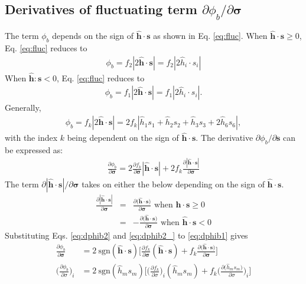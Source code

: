 \documentclass[12pt]{amsart}
\begin{document}
\subsection{Derivatives of fluctuating term $\partial\phi_b/\partial\mathbf{\sigma}$}
\label{sec:2.2}
The term $\phi_b$ depends on the sign of $\hat{\mathbf{h}}\cdot\mathbf{s}$ as shown in Eq. \ref{eq:fluc}.
When $\hat{\mathbf{h}}\cdot\mathbf{s}\ge0$, Eq. \ref{eq:fluc} reduces to
\begin{eqnarray}
    \label{eq:fluc1}
\phi_b =f_2|2\hat{\mathbf{h}}\cdot\mathbf{s}|=f_2|2\hat{h}_{i}\cdot s_{i}|
\end{eqnarray}
When $\hat{\mathbf{h}}:\mathbf{s}<0$, Eq. \ref{eq:fluc} reduces to
\begin{eqnarray}
    \label{eq:fluc2}
\phi_b  =f_1|2\hat{\mathbf{h}}\cdot\mathbf{s}|=f_1|2\hat{h}_{i}\cdot s_{i}|.
\end{eqnarray}
Generally,
\begin{eqnarray}
    \label{eq:fluc3}
\phi_b  =f_k|2\hat{\mathbf{h}}\cdot\mathbf{s}|=2f_k|\hat{h}_1s_1+\hat{h}_2s_2+\hat{h}_3s_3+2\hat{h}_6s_6|,
\end{eqnarray}
with the index $k$ being dependent on the sign of $\hat{\mathbf{h}}\cdot\mathbf{s}$.
The derivative $\partial\phi_b/\partial\mathbf{s}$ can be expressed as:
\begin{eqnarray}
    \label{eq:dphib1}
    \frac{\partial\phi_b}{\partial\mathbf{\sigma}} = 2\frac{\partial f_k}{\partial\mathbf{\sigma}}|\hat{\mathbf{h}}\cdot\mathbf{s}| + 2 f_k \frac{\partial|\hat{\mathbf{h}}\cdot\mathbf{s}|}{\partial\mathbf{\sigma}}
\end{eqnarray}
The term $\partial|\hat{\mathbf{h}}\cdot\mathbf{s}|/\partial\mathbf{\sigma}$ takes on either the below depending on the sign of $\hat{\mathbf{h}}\cdot\mathbf{s}$.
\begin{eqnarray}
  \label{eq:dphib2}
  \frac{\partial |\hat{\mathbf{h}}\cdot\mathbf{s}| }{\partial \mathbf{\sigma}} &=&  \frac{\partial \big(\hat{\mathbf{h}}\cdot\mathbf{s}\big)}{\partial\mathbf{\sigma}}   \text{  when } \hat{\mathbf{h}}\cdot\mathbf{s}\ge0\\
  \label{eq:dphib2_}
&=&- \frac{\partial \big(\hat{\mathbf{h}}\cdot\mathbf{s}\big)}{\partial\mathbf{\sigma}}   \text{  when } \hat{\mathbf{h}}\cdot\mathbf{s} < 0
\end{eqnarray}
Substituting Eqs. \ref{eq:dphib2} and \ref{eq:dphib2_} to \ref{eq:dphib1} gives
\begin{equation}
  \label{eq:dphib1_}
  \begin{split}
    \frac{\partial\phi_b}{\partial\mathbf{\sigma}}          &= 2\ \text{sgn}(\hat{\mathbf{h}}\cdot\mathbf{s}) \bigg[  \frac{\partial{f_k}}{\partial{\mathbf{\sigma}}} (\hat{\mathbf{h}}\cdot\mathbf{s}) + f_k \frac{\partial\big({\hat{\mathbf{h}}\cdot\mathbf{s}}\big)}{\partial{\mathbf{\sigma}}} \bigg]\\
    \bigg(\frac{\partial\phi_b}{\partial \sigma}\bigg)_{i} &= 2\ \text{sgn}(\hat{h}_{m}s_{m}) \bigg[  \bigg(\frac{\partial f_k}{\partial \sigma}\bigg)_{i} (\hat{h}_{m}s_{m}) + f_k \bigg(\frac{\partial\big({\hat{h}_{m}s_{m}}\big)}{\partial \sigma}\bigg)_{i} \bigg]\\
  \end{split}
\end{equation}
\end{document}
